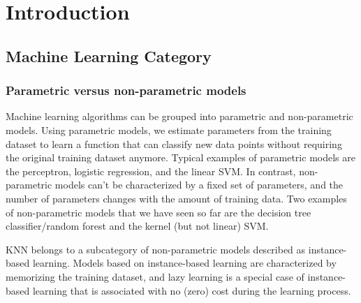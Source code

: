 \chapter{Introduction}
\section{Machine Learning Category}
\subsection{Parametric versus non-parametric models}
Machine learning algorithms can be grouped into parametric and non-parametric models. Using parametric models, we estimate parameters from the training dataset to learn a function that can classify new data points without requiring the original training dataset anymore. Typical examples of parametric models are the perceptron, logistic regression, and the linear SVM. In contrast, non-parametric models can't be characterized by a fixed set of parameters, and the number of parameters changes with the amount of training data. Two examples of non-parametric models that we have seen so far are the decision tree classifier/random forest and the kernel (but not linear) SVM.

KNN belongs to a subcategory of non-parametric models described as instance-based learning. Models based on instance-based learning are characterized by memorizing the training dataset, and lazy learning is a special case of instance-based learning that is associated with no (zero) cost during the learning process.